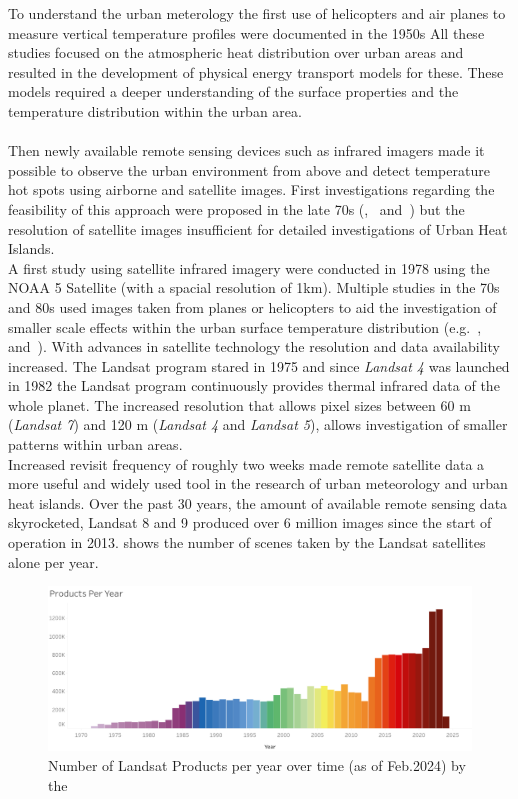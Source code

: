 \documentclass[12pt,a4paper, english]{article}
\begin{document}
  To understand the urban meterology the first use of helicopters and air planes to measure vertical temperature profiles were documented in the 1950s  
  All these studies focused on the atmospheric heat distribution over urban areas and resulted in the development of physical energy transport models for these. 
  These models required a deeper understanding of the surface properties and the temperature distribution within the urban area.\\ \\
  Then newly available remote sensing devices such as infrared imagers made it possible to observe the urban environment from above and detect temperature hot spots using airborne and satellite images.  
  First investigations regarding the feasibility of this approach were proposed in the late 70s (\cite{Watson1975},~\cite{Carlson1977} and~\cite{Block1978}) but the resolution of satellite images insufficient for detailed investigations of Urban Heat Islands.\\
  A first study using satellite infrared imagery were conducted in 1978 using the NOAA 5 Satellite (with a spacial resolution of 1km)\cite{Matson1978}. 
  Multiple studies in the 70s and 80s used images taken from planes or helicopters to aid the investigation of smaller scale effects within the urban surface temperature distribution (e.g.~\cite{Landsberg1979},~\cite{ljungberg1980use} and~\cite{Foster1981}).
  With advances in satellite technology the resolution and data availability increased. 
  The Landsat program stared in 1975 and since \textit{Landsat 4} was launched in 1982 the Landsat program continuously provides thermal infrared data of the whole planet. 
  The increased resolution that allows pixel sizes between 60 m (\textit{Landsat 7}) and 120 m (\textit{Landsat 4} and \textit{Landsat 5}), allows investigation of smaller patterns within urban areas.\\
  Increased revisit frequency of roughly two weeks made remote satellite data a more useful and widely used tool in the research of urban meteorology and urban heat islands. 
  Over the past 30 years, the amount of available remote sensing data skyrocketed, Landsat 8 and 9 produced over 6 million images since the start of operation in 2013.  shows the number of scenes taken by the Landsat satellites alone per year.
  \begin{figure}[!htbp]
    \centering
    \includegraphics[width=\textwidth]{img/LandsatDataArchiveStatsProductsPerYear.png}
    \caption{Number of Landsat Products per year over time (as of Feb.2024) by the~\cite{landsatstats}\label{fig:landsatproductsovertime}}
  \end{figure}
\end{document}
